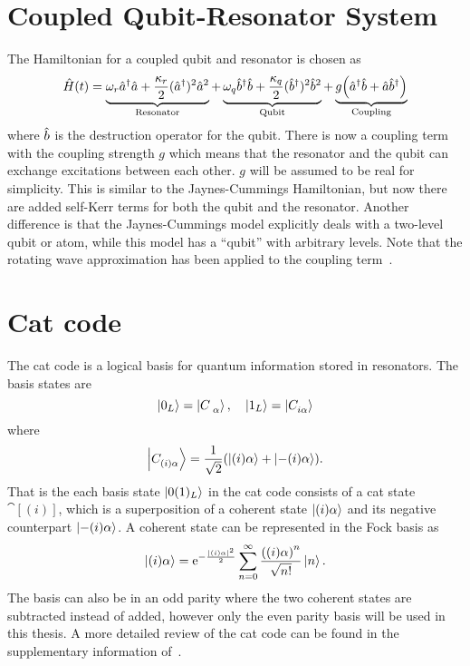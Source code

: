 \documentclass[main.tex]{subfiles}
\begin{document}
\section{Coupled Qubit-Resonator System}
The Hamiltonian for a coupled qubit and resonator is chosen as
\begin{equation}
    \Ham(t) = \underbrace{\omega_{r}\au\ad + \frac{\kappa_r}{2}(\au)^2\ad^2}_{\text{Resonator}} + \underbrace{\omega_{q}\bu\bd + \frac{\kappa_q}{2}(\bu)^2\bd^2}_{\text{Qubit}} + \underbrace{g\qty(\au\bd+\ad\bu)}_{\text{Coupling}}
    \label{eq:hamiltonian-coupled}
\end{equation}
where \( \bd \) is the destruction operator for the qubit.
There is now a coupling term with the coupling strength \(g\) which means that the resonator and the qubit can exchange excitations between each other.
\(g\) will be assumed to be real for simplicity.
This is similar to the Jaynes-Cummings Hamiltonian, but now there are added self-Kerr terms for both the qubit and the resonator.
Another difference is that the Jaynes-Cummings model explicitly deals with a two-level qubit or atom, while this model has a ``qubit'' with arbitrary levels.
Note that the rotating wave approximation has been applied to the coupling term~\cite{wu_strong-coupling_2007}.

\section{Cat code}
\label{sec:cat-code}
The cat code is a logical basis for quantum information stored in resonators.
The basis states are
\begin{equation}
    \ket{0_L} = \cat{},\quad \ket{1_L} = \cat[i]{}
\end{equation}
where 
\begin{equation}
    \cat[(i)]{} = \frac{1}{\sqrt{2}}\qty(\ket{(i)\alpha} + \ket{-(i)\alpha}).
\end{equation}
That is the each basis state \( \ket{0(1)_L} \) in the cat code consists of a cat state \(\cat[(i)]{}\), which is a superposition of a coherent state \(\ket{(i)\alpha}\) and its negative counterpart \(\ket{-(i)\alpha}\).
A coherent state can be represented in the Fock basis as
\begin{equation}
    \ket{(i)\alpha} =\ex^{-{\frac{|(i)\alpha|^2}{2}}}\sum_{n=0}^{\infty}{\frac{\qty((i)\alpha)^n}{\sqrt{n!}}}\ket{n}.
\end{equation}
The basis can also be in an odd parity where the two coherent states are subtracted instead of added, however only the even parity basis will be used in this thesis.
A more detailed review of the cat code can be found in the supplementary information of~\cite{ofek_extending_2016}.
\end{document}
